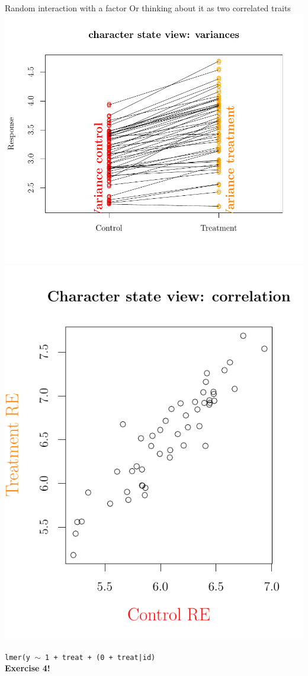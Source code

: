 \documentclass{beamer}
\begin{document}
\begin{frame}{Random interaction with a factor}
 Or thinking about it as two correlated traits
 \centering
 \includegraphics[height=0.6\textheight]{figure/charst1-1}
 \includegraphics[height=0.6\textheight]{figure/charst2-1}

 \texttt{lmer(y $\sim$ 1 + treat + (0 + treat|id)}\\
 \pause
 \textbf{Exercise 4!}
\end{frame}
\end{document}
